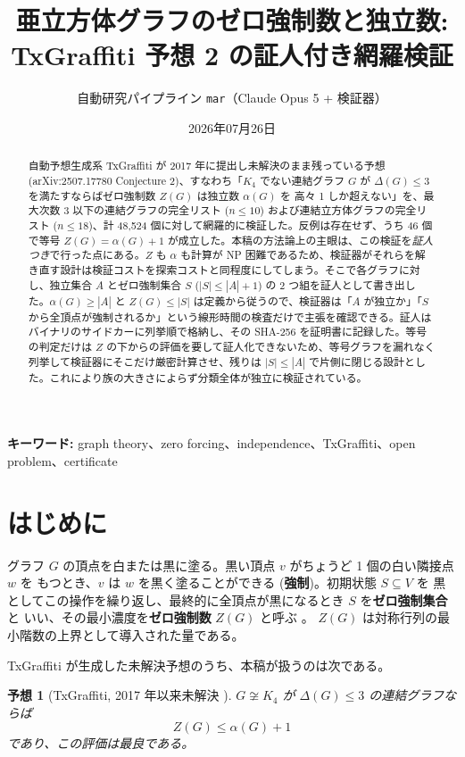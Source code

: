 \documentclass[paper=a4,fontsize=10.5pt,jafontsize=10.5pt]{jlreq}
\title{亜立方体グラフのゼロ強制数と独立数: TxGraffiti 予想 2 の証人付き網羅検証}
\author{自動研究パイプライン \texttt{mar}（Claude Opus 5 + 検証器）}
\date{2026年07月26日}
\theoremstyle{plain}
\newtheorem{conjecture}[theorem]{予想}
\theoremstyle{definition}
\begin{document}
\maketitle

\begin{abstract}
自動予想生成系 TxGraffiti が 2017 年に提出し未解決のまま残っている予想 (arXiv:2507.17780 Conjecture 2)、すなわち「$K_4$ でない連結グラフ $G$ が $\Delta(G) \le 3$ を満たすならばゼロ強制数 $Z(G)$ は独立数 $\alpha(G)$ を 高々 1 しか超えない」を、最大次数 3 以下の連結グラフの完全リスト ($n \le 10$) および連結立方体グラフの完全リスト ($n \le 18$)、計 48,524 個に対して網羅的に検証した。反例は存在せず、うち 46 個で等号 $Z(G) = \alpha(G)+1$ が成立した。本稿の方法論上の主眼は、この検証を\emph{証人つき}で行った点にある。$Z$ も $\alpha$ も計算が NP 困難であるため、検証器がそれらを解き直す設計は検証コストを探索コストと同程度にしてしまう。そこで各グラフに対し、独立集合 $A$ とゼロ強制集合 $S$ ($|S| \le |A|+1$) の 2 つ組を証人として書き出した。$\alpha(G) \ge |A|$ と $Z(G) \le |S|$ は定義から従うので、検証器は「$A$ が独立か」「$S$ から全頂点が強制されるか」という線形時間の検査だけで主張を確認できる。証人はバイナリのサイドカーに列挙順で格納し、その SHA-256 を証明書に記録した。等号の判定だけは $Z$ の下からの評価を要して証人化できないため、等号グラフを漏れなく列挙して検証器にそこだけ厳密計算させ、残りは $|S| \le |A|$ で片側に閉じる設計とした。これにより族の大きさによらず分類全体が独立に検証されている。
\end{abstract}

\noindent\textbf{キーワード:} graph theory、zero forcing、independence、TxGraffiti、open problem、certificate


\section{はじめに}

グラフ $G$ の頂点を白または黒に塗る。黒い頂点 $v$ がちょうど 1 個の白い隣接点 $w$ を
もつとき、$v$ は $w$ を黒く塗ることができる (\textbf{強制})。初期状態 $S \subseteq V$ を
黒としてこの操作を繰り返し、最終的に全頂点が黒になるとき $S$ を\textbf{ゼロ強制集合}と
いい、その最小濃度を\textbf{ゼロ強制数} $Z(G)$ と呼ぶ \cite{aim2008}。
$Z(G)$ は対称行列の最小階数の上界として導入された量である。

TxGraffiti \cite{reverie} が生成した未解決予想のうち、本稿が扱うのは次である。

\begin{conjecture}[TxGraffiti, 2017 年以来未解決 \cite{reverie}]
\label{conj:main}
$G \not\cong K_4$ が $\Delta(G) \le 3$ の連結グラフならば
\[ Z(G) \le \alpha(G) + 1 \]
であり、この評価は最良である。
\end{conjecture}
\end{document}
